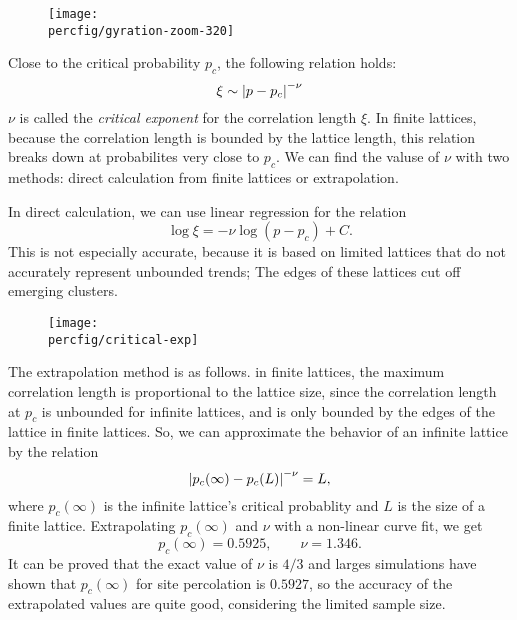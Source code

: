\documentclass[12pt,a4paper]{article}
\newcommand{\percfig}{../fig/percolation}
\begin{document}
	\restoregeometry
	\begin{figure}
		\centering
		\texttt{[image: \\percfig/gyration-zoom-320]}
	\end{figure}
	Close to the critical probability $p_c$, the following relation holds:
	\begin{equation}
		\xi \sim \abs{p - p_c}^{-\nu}
	\end{equation}
	$\nu$ is called the \emph{critical exponent} for the correlation length $\xi$. In finite lattices, because
	the correlation length is bounded by the lattice length, this relation breaks down at probabilites very
	close to $p_c$. We can find the valuse of $\nu$ with two methods: direct calculation from finite lattices
	or extrapolation.

	In direct calculation, we can use linear regression for the relation
	\begin{equation}
		\log{\xi} = -\nu\log(p - p_c) + C.
	\end{equation}
	This is not especially accurate, because it is based on limited lattices that do not accurately represent unbounded
	trends; The edges of these lattices cut off emerging clusters.
	\begin{figure}
		\centering
		\texttt{[image: \\percfig/critical-exp]}
	\end{figure}

	The extrapolation method is as follows. in finite lattices, the maximum correlation length is proportional to the
	lattice size, since the correlation length at $p_c$ is unbounded for infinite lattices, and is only bounded by the
	edges of the lattice in finite lattices. So, we can approximate the behavior of an infinite lattice by the relation
	\begin{equation}
		\abs{p_c(\infty) - p_c(L)}^{-\nu} = L,
	\end{equation}
	where $p_c(\infty)$ is the infinite lattice's critical probablity and $L$ is the size of a finite lattice.
	Extrapolating $p_c(\infty)$ and $\nu$ with a non-linear curve fit, we get
	\begin{equation}
		p_c(\infty) = 0.5925 ,\qquad \nu = 1.346.
	\end{equation}
	It can be proved that the exact value of $\nu$ is $4/3$ and larges simulations have shown that $p_c(\infty)$ for
	site percolation is $0.5927$, so the accuracy of the extrapolated values are quite good, considering the limited
	sample size.
	
\end{document}
